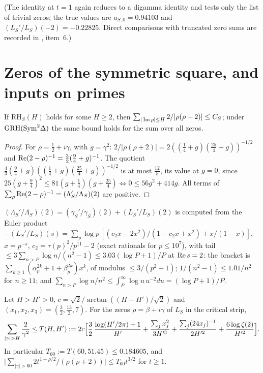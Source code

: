 (The identity at $t=1$ again reduces to a digamma identity and tests only the list of trivial zeros; the true values are $a_{S,0}=0.94103$ and $(L_S'/L_S)(-2)=-0.22825$. Direct comparisons with truncated zero sums are recorded in , item~6.)

\section{Zeros of the symmetric square, and inputs on primes}\label{sec:sym2zeros}

\begin{lemma}\label{lem:lowzeros}
If $\mathrm{RH}_S(H)$ holds for some $H\ge2$, then $\sum_{|\operatorname{Im}\rho|\le H}2/|\rho(\rho+2)|\le C_S$; under $\mathrm{GRH}(\mathrm{Sym}^2\Delta)$ the same bound holds for the sum over all zeros.
\end{lemma}

\begin{proof}
For $\rho=\frac12+i\gamma$, with $g=\gamma^2$: $2/|\rho(\rho+2)|=2((\frac14+g)(\frac{25}4+g))^{-1/2}$ and $\operatorname{Re}(2-\rho)^{-1}=\frac32(\frac94+g)^{-1}$. The quotient $\frac43(\frac94+g)((\frac14+g)(\frac{25}4+g))^{-1/2}$ is at most $\frac{12}5$, its value at $g=0$, since $25(g+\frac94)^2\le81(g+\frac14)(g+\frac{25}4)\iff0\le56g^2+414g$. All terms of $\sum_\rho\operatorname{Re}(2-\rho)^{-1}=(\Lambda_S'/\Lambda_S)(2)$ are positive.
\end{proof}

$(\Lambda_S'/\Lambda_S)(2)=(\gamma_S'/\gamma_S)(2)+(L_S'/L_S)(2)$ is computed from the Euler product $-(L_S'/L_S)(s)=\sum_p\log p\,[(c_2x-2x^2)/(1-c_2x+x^2)+x/(1-x)]$, $x=p^{-s}$, $c_2=\tau(p)^2/p^{11}-2$ (exact rationals for $p\le10^7$), with tail $\le3\sum_{n>P}\log n/(n^2-1)\le3.03(\log P+1)/P$ at $\operatorname{Re} s=2$: the bracket is $\sum_{k\ge1}(\alpha_p^{2k}+1+\beta_p^{2k})x^k$, of modulus $\le3/(p^2-1)$; $1/(n^2-1)\le1.01/n^2$ for $n\ge11$; and $\sum_{n>P}\log n/n^2\le\int_P^\infty\log u\,u^{-2}du=(\log P+1)/P$.

\begin{lemma}\label{lem:highzeros}
Let $H>H'>0$, $c=\sqrt2/\arctan((H-H')/\sqrt2)$ and $(x_1,x_2,x_3)=(\frac32,\frac{13}2,7)$. For the zeros $\rho=\beta+i\gamma$ of $L_S$ in the critical strip,
\[
\sum_{|\gamma|>H}\frac2{\gamma^2}\le T(H,H'):=2c\Bigl[\frac32\,\frac{\log(H'/2\pi)+1}{H'}+\frac{\sum_jx_j^2}{3H'^3}+\frac{\sum_j(24x_j)^{-1}}{2H'^2}+\frac{6\log\zeta(2)}{H'^2}\Bigr].
\]
In particular $T_{60}:=T(60,51.45)\le0.184605$, and $\bigl|\sum_{|\gamma|>60}2t^{1+\rho/2}/(\rho(\rho+2))\bigr|\le T_{60}t^{3/2}$ for $t\ge1$.
\end{lemma}

